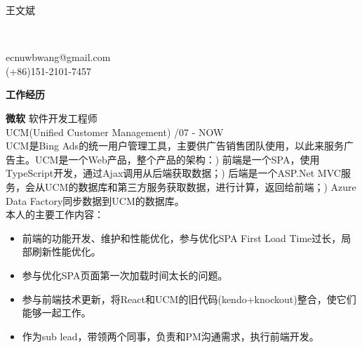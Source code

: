 \documentclass[a4paper]{article}
\newenvironment{changemargin}[2]{%
  \begin{list}{}{%
    \setlength{\topsep}{0pt}%
    \setlength{\leftmargin}{#1}%
    \setlength{\rightmargin}{#2}%
    \setlength{\listparindent}{\parindent}%
    \setlength{\itemindent}{\parindent}%
    \setlength{\parsep}{\parskip}%
  }%
  \item[]}{\end{list}
}
\newcommand{\lineover}{
	\begin{changemargin}{-0.05in}{-0.05in}
		\vspace*{-8pt}
		\hrulefill \\
		\vspace*{-2pt}
	\end{changemargin}
}
\newcommand{\header}[1]{
	\begin{changemargin}{-0.5in}{-0.5in}
		\scshape{\textbf{#1}}\\
	\end{changemargin}
}
\newcommand{\contact}[3]{
	\begin{changemargin}{-0.5in}{-0.5in}
		{\Large \scshape {#1}}\\ \smallskip
		\lineover
		\begin{flushright}
			{\fontarial #2}\\ \smallskip
			{\fontarial #3}\smallskip
		\end{flushright}
	\end{changemargin}
}
\newenvironment{body} {
	\vspace*{-16pt}
	\begin{changemargin}{-0.25in}{-0.5in}
  }	
	{\end{changemargin}
}
\begin{document}
\contact{王文斌}{ecnuwbwang@gmail.com}{(+86)151-2101-7457}

\renewcommand{\baselinestretch}{1.2} \normalsize

\header{工作经历}

\begin{body}
	\vspace{14pt}
	\textbf{微软} \hfill 软件开发工程师\\ 
	{\fontarial UCM(Unified Customer Management)} \hfill {/07 - NOW}\\ 
	{\fontarial UCM}是{\fontarial Bing Ads}的统一用户管理工具，主要供广告销售团队使用，以此来服务广告主。{\fontarial UCM}是一个{\fontarial Web}产品，整个产品的架构：{)} 前端是一个{\fontarial SPA}，使用{\fontarial TypeScript}开发，通过{\fontarial Ajax}调用从后端获取数据；{)} 后端是一个{\fontarial ASP.Net MVC}服务，会从{\fontarial UCM}的数据库和第三方服务获取数据，进行计算，返回给前端；{)} {\fontarial Azure Data Factory}同步数据到{\fontarial UCM}的数据库。\\
	本人的主要工作内容：\\ 
	\vspace*{-6pt}
	\begin{itemize} \itemsep -0pt  %
		\item 前端的功能开发、维护和性能优化，参与优化{\fontarial SPA First Load Time}过长，局部刷新性能优化。\\
	\end{itemize}
	\vspace*{-12pt}
	\begin{itemize} \itemsep -0pt  %
		\item 参与优化{\fontarial SPA}页面第一次加载时间太长的问题。\\
	\end{itemize}
	\vspace*{-12pt}
	\begin{itemize} \itemsep -0pt  %
		\item 参与前端技术更新，将{\fontarial React}和{\fontarial UCM}的旧代码{\fontarial (kendo+knockout)}整合，使它们能够一起工作。\\
	\end{itemize}
	\vspace*{-12pt}
	\begin{itemize} \itemsep -0pt  %
		\item 作为{\fontarial sub lead}，带领两个同事，负责和{\fontarial PM}沟通需求，执行前端开发。\\
	\end{itemize}
\end{body}
\end{document}
